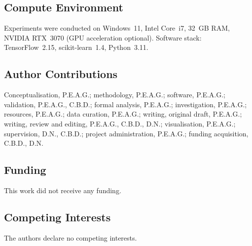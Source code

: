 \documentclass[pdflatex,sn-basic]{sn-jnl}
\begin{document}
\subsection*{Compute Environment}
Experiments were conducted on Windows~11, Intel Core~i7, 32~GB RAM, NVIDIA RTX~3070 (GPU acceleration optional). Software stack: TensorFlow~2.15, scikit-learn~1.4, Python~3.11.

\subsection*{Author Contributions}
Conceptualisation, P.E.A.G.; methodology, P.E.A.G.; software, P.E.A.G.; validation, P.E.A.G., C.B.D.; formal analysis, P.E.A.G.; investigation, P.E.A.G.; resources, P.E.A.G.; data curation, P.E.A.G.; writing, original draft, P.E.A.G.; writing, review and editing, P.E.A.G., C.B.D., D.N.; visualisation, P.E.A.G.; supervision, D.N., C.B.D.; project administration, P.E.A.G.; funding acquisition, C.B.D., D.N.

\subsection*{Funding}
This work did not receive any funding.

\subsection*{Competing Interests}
The authors declare no competing interests.


\end{document}

